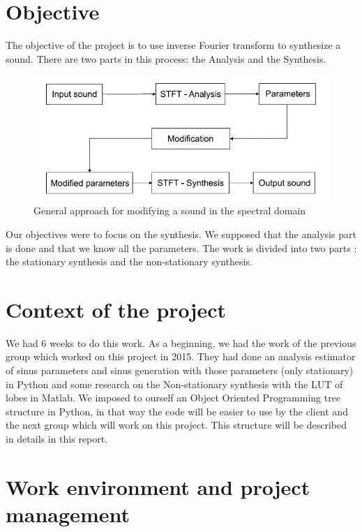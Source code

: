 \documentclass[]{article}
\begin{document}
\section{Objective}\label{sec:objective}

The objective of the project is to use
inverse Fourier transform to synthesize a sound. There are two
parts in this process: the Analysis and the Synthesis.
	\begin{figure}[H]
		\centering
		\includegraphics[scale=0.4]{Analysis_Synthesis.png}
		\caption{General approach for modifying a sound in the spectral domain}
	\end{figure}

Our objectives were to focus on the synthesis. We supposed that the analysis part is done and that we know all the parameters. The work is divided into two parts : the stationary synthesis and the non-stationary synthesis. 
\section{Context of the project}\label{sec:context-of-the-project}
We had 6 weeks to do this work. As a beginning, we had the work of the previous group which worked on this project in 2015. They had done an analysis estimator of sinus parameters and sinus generation with those
parameters (only stationary) in Python and some research on the Non-stationary synthesis with the LUT of lobes in Matlab.
We imposed to ourself an Object Oriented Programming tree structure in Python, in that way the code will be easier to use by the client and the next group which will work on this project. This structure will be described in details in this report. 
\section{Work environment and project management}\label{sec:work-environment-and-project-management}
\end{document}

